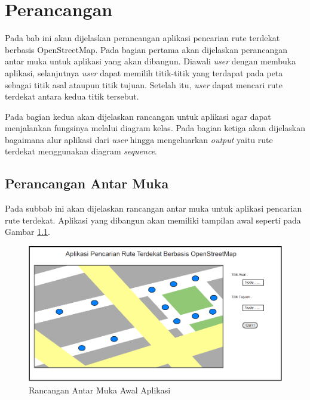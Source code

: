 \chapter{Perancangan}
Pada bab ini akan dijelaskan perancangan aplikasi pencarian rute terdekat
berbasis OpenStreetMap. Pada bagian pertama akan dijelaskan perancangan antar
muka untuk aplikasi yang akan dibangun. Diawali \textit{user} dengan membuka
aplikasi, selanjutnya \textit{user} dapat memilih titik-titik yang terdapat pada
peta sebagai titik asal ataupun titik tujuan. Setelah itu, \textit{user} dapat
mencari rute terdekat antara kedua titik tersebut.

Pada bagian kedua akan dijelaskan rancangan untuk aplikasi agar dapat
menjalankan fungsinya melalui diagram kelas. Pada bagian ketiga akan dijelaskan
bagaimana alur aplikasi dari \textit{user} hingga mengeluarkan \textit{output} yaitu rute terdekat
menggunakan diagram \textit{sequence}.

\section{Perancangan Antar Muka}
Pada subbab ini akan dijelaskan rancangan antar muka untuk aplikasi pencarian
rute terdekat. Aplikasi yang dibangun akan memiliki tampilan awal seperti pada
Gambar \ref{fig:mockup_1}.
\begin{figure}[h]
\centering
\includegraphics[scale=0.6]{Gambar/mockup_1}
\caption[Rancangan Antar Muka Awal Aplikasi]{Rancangan Antar Muka Awal Aplikasi}
\label{fig:mockup_1}
\end{figure}

